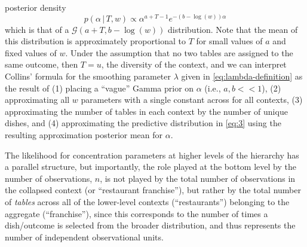 \documentclass[12pt,letterpaper]{report}
\newcommand{\Gamm}[2]{\mathcal{G}(#1,#2)}
\newcommand{\given}{\, \vert \,}
\begin{document}
posterior density
\begin{equation}
  \label{eq:alpha-given-w-and-T}
  p(\alpha \given T, w) \propto
  \alpha^{a + T - 1} e^{-\left(b - \log(w)\right)\alpha}
\end{equation}
which is that of a $\Gamm{a + T}{b - \log(w)}$
distribution.  Note that the mean of this distribution is
approximately proportional to $T$ for small values of $a$ and fixed
values of $w$.  Under the assumption that no two tables are assigned
to the same outcome, then $T = u$, the diversity of the
context, and we can interpret Collins' formula for the smoothing
parameter $\lambda$ given in \eqref{eq:lambda-definition} as the result
of (1) placing a ``vague'' Gamma prior on $\alpha$ (i.e., $a, b << 1$), 
(2) approximating all $w$ parameters with a single constant across for all
contexts, (3) approximating the number of tables in each context by the number of unique
dishes, and (4) approximating the predictive distribution in
\eqref{eq:3} using the resulting approximation posterior mean for
$\alpha$.

The likelihood for concentration parameters at higher levels of the
hierarchy has a parallel structure, but importantly, the role played
at the bottom level by the number of observations, $n$, is not played
by the total number of observations in the collapsed context
(or ``restaurant franchise''), but
rather by the total number of {\it tables} across all of the
lower-level contexts (``restaurants'') belonging to the aggregate
(``franchise''), since this corresponds to the
number of times a dish/outcome is selected from the broader
distribution, and thus represents the number of independent
observational units.  
\end{document}
